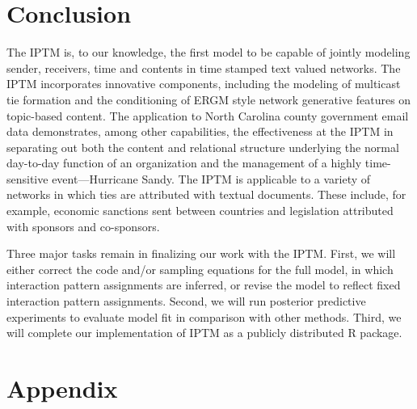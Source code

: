 \documentclass[a4paper]{article}
\begin{document}
\section{Conclusion} 
The IPTM is, to our knowledge, the first model to be capable of jointly modeling sender, receivers, time and contents in time stamped text valued networks. The IPTM incorporates innovative components, including the modeling of multicast tie formation and the conditioning of ERGM style network generative features on topic-based content. The application to North Carolina county government email data demonstrates, among other capabilities, the effectiveness at the IPTM in separating out both the content and relational structure underlying the normal day-to-day function of an organization and the management of a highly time-sensitive event---Hurricane Sandy. The IPTM is applicable to a variety of networks in which ties are attributed with textual documents. These include, for example, economic sanctions sent between countries and legislation attributed with sponsors and co-sponsors. 

Three major tasks remain in finalizing our work with the IPTM. First, we will either correct the code and/or sampling equations for the full model, in which interaction pattern assignments are inferred, or revise the model to reflect fixed interaction pattern assignments. Second, we will run posterior predictive experiments to evaluate model fit in comparison with other methods. Third, we will complete our implementation of IPTM as a publicly distributed R package.

  
 \clearpage


\newpage
\appendix
 \section*{Appendix}
 \renewcommand{\thesubsection}{\Alph{subsection}}
\end{document}
